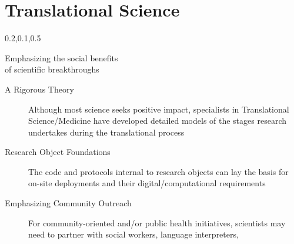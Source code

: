 
\section{Translational Science}\fbeg{}\begin{frame}{}

\vspace{-3.5em}	


	
{\Large{}\selectfont
\vspace{1em}
\begin{center}
\begin{minipage}{\textwidth}
\vspace{1em}
{\begin{minipage}{\textwidth}%
\begin{lightquadblockc}{0.2,0.1,0.5}{\parbox{21cm}{\vspace*{10pt}\centering Emphasizing the social benefits %
\\of scientific breakthroughs\vspace*{10pt}}}
\hspace{10pt}\begin{minipage}{1.1\textwidth}
{\LARGE {}\selectfont \setlength{\leftmargini}{3pt}\begin{description}
\item[A Rigorous Theory] Although most science seeks positive impact, specialists 
in Translational Science/Medicine have developed detailed models 
of the stages research undertakes during the translational process \vspace{10pt} 	
\item[Research Object Foundations] The code and protocols internal to research 
objects can lay the basis for on-site deployments and their digital/computational requirements \vspace{10pt}
\item[Emphasizing Community Outreach] For community-oriented 
and/or public health initiatives, scientists may need to 
partner with social workers, language interpreters, 

\end{description}}
\end{minipage}
\end{lightquadblockc}
\end{minipage}}
\end{minipage}
\end{center}}
\end{frame}
